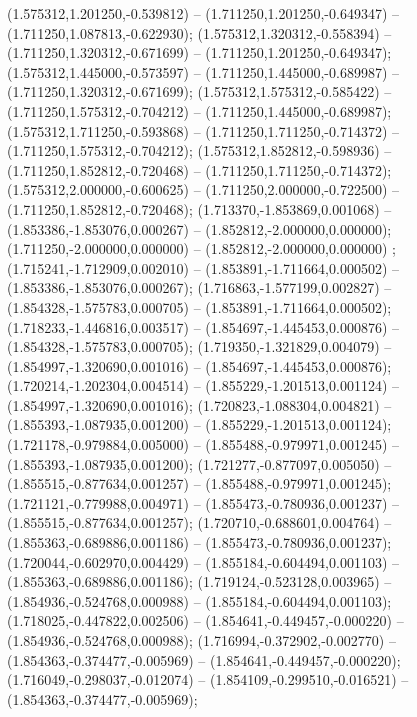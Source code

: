  (1.575312,1.201250,-0.539812) -- (1.711250,1.201250,-0.649347) -- (1.711250,1.087813,-0.622930);
 (1.575312,1.320312,-0.558394) -- (1.711250,1.320312,-0.671699) -- (1.711250,1.201250,-0.649347);
 (1.575312,1.445000,-0.573597) -- (1.711250,1.445000,-0.689987) -- (1.711250,1.320312,-0.671699);
 (1.575312,1.575312,-0.585422) -- (1.711250,1.575312,-0.704212) -- (1.711250,1.445000,-0.689987);
 (1.575312,1.711250,-0.593868) -- (1.711250,1.711250,-0.714372) -- (1.711250,1.575312,-0.704212);
 (1.575312,1.852812,-0.598936) -- (1.711250,1.852812,-0.720468) -- (1.711250,1.711250,-0.714372);
 (1.575312,2.000000,-0.600625) -- (1.711250,2.000000,-0.722500) -- (1.711250,1.852812,-0.720468);
 (1.713370,-1.853869,0.001068) -- (1.853386,-1.853076,0.000267) -- (1.852812,-2.000000,0.000000);
 (1.711250,-2.000000,0.000000) -- (1.852812,-2.000000,0.000000) ;
 (1.715241,-1.712909,0.002010) -- (1.853891,-1.711664,0.000502) -- (1.853386,-1.853076,0.000267);
 (1.716863,-1.577199,0.002827) -- (1.854328,-1.575783,0.000705) -- (1.853891,-1.711664,0.000502);
 (1.718233,-1.446816,0.003517) -- (1.854697,-1.445453,0.000876) -- (1.854328,-1.575783,0.000705);
 (1.719350,-1.321829,0.004079) -- (1.854997,-1.320690,0.001016) -- (1.854697,-1.445453,0.000876);
 (1.720214,-1.202304,0.004514) -- (1.855229,-1.201513,0.001124) -- (1.854997,-1.320690,0.001016);
 (1.720823,-1.088304,0.004821) -- (1.855393,-1.087935,0.001200) -- (1.855229,-1.201513,0.001124);
 (1.721178,-0.979884,0.005000) -- (1.855488,-0.979971,0.001245) -- (1.855393,-1.087935,0.001200);
 (1.721277,-0.877097,0.005050) -- (1.855515,-0.877634,0.001257) -- (1.855488,-0.979971,0.001245);
 (1.721121,-0.779988,0.004971) -- (1.855473,-0.780936,0.001237) -- (1.855515,-0.877634,0.001257);
 (1.720710,-0.688601,0.004764) -- (1.855363,-0.689886,0.001186) -- (1.855473,-0.780936,0.001237);
 (1.720044,-0.602970,0.004429) -- (1.855184,-0.604494,0.001103) -- (1.855363,-0.689886,0.001186);
 (1.719124,-0.523128,0.003965) -- (1.854936,-0.524768,0.000988) -- (1.855184,-0.604494,0.001103);
 (1.718025,-0.447822,0.002506) -- (1.854641,-0.449457,-0.000220) -- (1.854936,-0.524768,0.000988);
 (1.716994,-0.372902,-0.002770) -- (1.854363,-0.374477,-0.005969) -- (1.854641,-0.449457,-0.000220);
 (1.716049,-0.298037,-0.012074) -- (1.854109,-0.299510,-0.016521) -- (1.854363,-0.374477,-0.005969);
